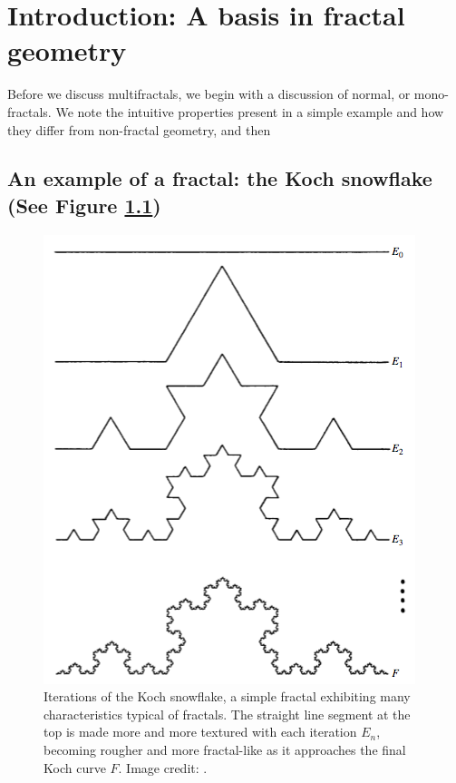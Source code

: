 
\chapter{Introduction: A basis in fractal geometry} %

\label{Chapter1} %



Before we discuss multifractals, we begin with a discussion of normal, or mono-fractals. We note the intuitive properties present in a simple example and how they differ from non-fractal geometry, and then 

\section{An example of a fractal: the Koch snowflake (See Figure \ref{fig:kochcurve})}
\begin{figure}
\centering
\includegraphics[scale=0.5]{Chapters/Figures/Kochcurve.png} 
\caption[Koch Curve]{Iterations of the Koch snowflake, a simple fractal exhibiting many characteristics typical of fractals. The straight line segment at the top is made more and more textured with each iteration $E_{n}$, becoming rougher and more fractal-like as it approaches the final Koch curve $F$. Image credit: \citep{fractaltextbook}. }\label{fig:kochcurve}
\end{figure}


